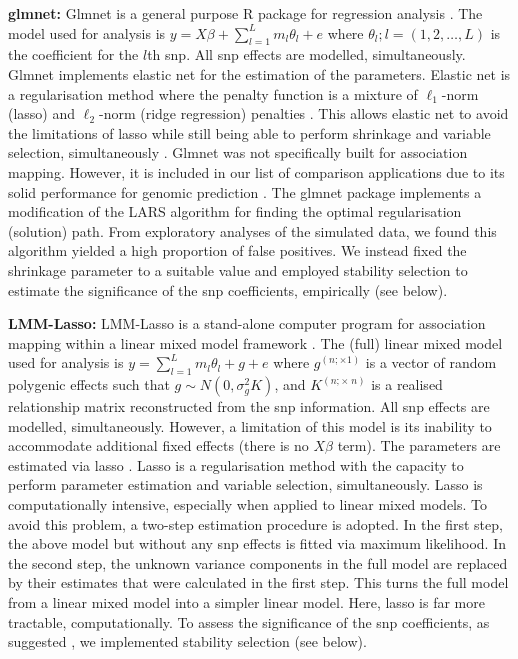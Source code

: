 \documentclass{nature}
\begin{document}
\textbf{glmnet:}  Glmnet is a general purpose R package for regression analysis  \cite{Friedman2010glmnet}. 
The model used for analysis is 
$y = X \beta + \sum_{l=1}^L m_l \theta_l + e$ where $\theta_l; l=(1,2, \ldots, L)$ is the coefficient for the $l$th snp. 
All snp effects are modelled, simultaneously. 
Glmnet implements elastic net for the estimation of the parameters. Elastic net is a regularisation method where the 
penalty function is a mixture of 
$\ell_1$-norm (lasso) and $\ell_2$-norm (ridge regression) penalties  \cite{zou2005regularization}. 
This allows elastic net to avoid the limitations of lasso 
while still being able to perform shrinkage and variable selection, simultaneously \cite{zou2005regularization}. 
Glmnet was not specifically built for association mapping. 
However, it is included in our list of comparison applications due to its solid performance for genomic prediction 
\cite{heslot2012genomic,ogutu2012genomic}.
The glmnet package 
implements a modification of the LARS algorithm \cite{efron2004least} for finding the optimal regularisation (solution) path. 
From exploratory analyses of the simulated data, we found this algorithm yielded a high proportion of false positives. 
We instead fixed the shrinkage parameter to a suitable value 
and employed stability selection to estimate the significance of the snp coefficients, empirically (see below).  



\textbf{LMM-Lasso:} LMM-Lasso is a stand-alone computer program for association mapping within a linear 
mixed model framework \cite{rakitsch2013lasso}. The (full) linear mixed model used for analysis is 
$y =  \sum_{l=1}^L m_l \theta_l +   g  + e$ where $g^{(n ; \times 1)}$ is a vector of random polygenic effects such that 
$g \sim N(0, \sigma^2_g K)$, and $K^{(n ; \times \; n)}$ is a realised relationship matrix reconstructed from the snp information. 
All snp effects are modelled, simultaneously. However, a limitation of this model is its inability to accommodate 
additional fixed effects (there is no $X \beta$ term). 
The parameters are estimated via lasso \cite{Tibshirani1996lasso}. Lasso is a regularisation method with the capacity to perform parameter estimation and variable selection, simultaneously.  
Lasso is computationally intensive, especially when applied to linear mixed models. To avoid this problem, a two-step 
estimation procedure is adopted.  In the first step, the above model but without any snp effects is fitted via 
maximum likelihood. In the second step, the unknown variance components in the full model are replaced by their estimates that were calculated in the first step.  This turns the full model from a linear mixed model into a simpler linear model. Here, lasso is far more tractable, computationally.  To assess the significance of the snp coefficients, as suggested \cite{rakitsch2013lasso}, we implemented stability selection (see below). 
\end{document}
